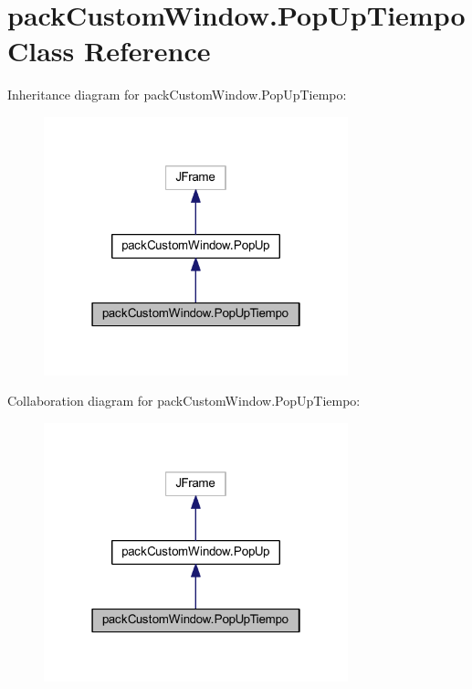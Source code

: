 \hypertarget{classpack_custom_window_1_1_pop_up_tiempo}{}\section{pack\+Custom\+Window.\+Pop\+Up\+Tiempo Class Reference}
\label{classpack_custom_window_1_1_pop_up_tiempo}


Inheritance diagram for pack\+Custom\+Window.\+Pop\+Up\+Tiempo\+:
\nopagebreak
\begin{figure}[H]
\begin{center}
\leavevmode
\includegraphics[width=250pt]{classpack_custom_window_1_1_pop_up_tiempo__inherit__graph}
\end{center}
\end{figure}


Collaboration diagram for pack\+Custom\+Window.\+Pop\+Up\+Tiempo\+:
\nopagebreak
\begin{figure}[H]
\begin{center}
\leavevmode
\includegraphics[width=250pt]{classpack_custom_window_1_1_pop_up_tiempo__coll__graph}
\end{center}
\end{figure}
